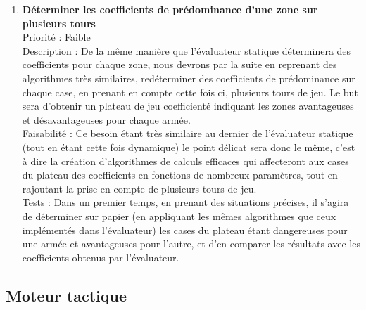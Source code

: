 \documentclass[12pt]{article}
\begin{document}
			\begin{enumerate}

				\item \textbf{Déterminer les coefficients de prédominance d'une zone sur plusieurs tours} \\[0.7\baselineskip]
				Priorité : Faible \\[0.7\baselineskip]
				Description : De la même manière que l'évaluateur statique déterminera des coefficients pour chaque zone, nous devrons par la suite en reprenant des algorithmes très similaires, redéterminer des coefficients de prédominance sur chaque case, en prenant en compte cette fois ci, plusieurs tours de jeu. Le but sera d'obtenir un plateau de jeu coefficienté indiquant les zones avantageuses et désavantageuses pour chaque armée. \\[0.7\baselineskip]
				Faisabilité : Ce besoin étant très similaire au dernier de l'évaluateur statique (tout en étant cette fois dynamique) le point délicat sera donc le même, c'est à dire la création d'algorithmes de calculs efficaces qui affecteront aux cases du plateau des coefficients en fonctions de nombreux paramètres, tout en rajoutant la prise en compte de plusieurs tours de jeu. \\[0.7\baselineskip]
				Tests : Dans un premier temps, en prenant des situations précises, il s'agira de déterminer sur papier (en appliquant les mêmes algorithmes que ceux implémentés dans l'évaluateur) les cases du plateau étant dangereuses pour une armée et avantageuses pour l'autre, et d'en comparer les résultats avec les coefficients obtenus par l'évaluateur. \\[0.7\baselineskip]
				
			\end{enumerate}

		\subsection{Moteur tactique}
\end{document}
